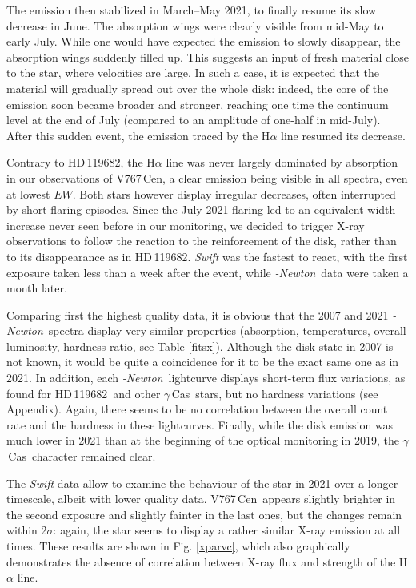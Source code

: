 \documentclass[a4paper,fleqn,usenatbib]{mnras}
\newcommand{\xmm}{{\sc{XMM}}\emph{-Newton}}
\newcommand{\gc}{$\gamma$\,Cas}
\newcommand{\hd}{HD\,119682}
\newcommand{\vc}{V767\,Cen}
\begin{document}
The emission then stabilized in March--May 2021, to finally resume its slow decrease in June. The absorption wings were clearly visible from mid-May to early July. While one would have expected the emission to slowly disappear, the absorption wings suddenly filled up. This suggests an input of fresh material close to the star, where velocities are large. In such a case, it is expected that the material will gradually spread out over the whole disk: indeed, the core of the emission soon became broader and stronger, reaching one time the continuum level at the end of July (compared to an amplitude of one-half in mid-July). After this sudden event, the emission traced by the H$\alpha$ line resumed its decrease. 

Contrary to \hd, the H$\alpha$ line was never largely dominated by absorption in our observations of \vc, a clear emission being visible in all spectra, even at lowest $EW$. Both stars however display irregular decreases, often interrupted by short flaring episodes. Since the July 2021 flaring led to an equivalent width increase never seen before in our monitoring, we decided to trigger X-ray observations to follow the reaction to the reinforcement of the disk, rather than to its disappearance as in \hd. {\it Swift} was the fastest to react, with the first exposure taken less than a week after the event, while \xmm\ data were taken a month later. 

Comparing first the highest quality data, it is obvious that the 2007 and 2021 \xmm\ spectra display very similar properties (absorption, temperatures, overall luminosity, hardness ratio, see Table \ref{fitsx}). Although the disk state in 2007 is not known, it would be quite a coincidence for it to be the exact same one as in 2021. In addition, each \xmm\ lightcurve displays short-term flux variations, as found for \hd\ and other \gc\ stars, but no hardness variations (see Appendix). Again, there seems to be no correlation between the overall count rate and the hardness in these lightcurves. Finally, while the disk emission was much lower in 2021 than at the beginning of the optical monitoring in 2019, the \gc\ character remained clear. 

The {\it Swift} data allow to examine the behaviour of the star in 2021 over a longer timescale, albeit with lower quality data. \vc\ appears slightly brighter in the second exposure and slightly fainter in the last ones, but the changes remain within 2$\sigma$: again, the star seems to display a rather similar X-ray emission at all times. These results are shown in Fig. \ref{xparvc}, which also graphically demonstrates the absence of correlation between X-ray flux and strength of the H$\alpha$ line.
\end{document}
